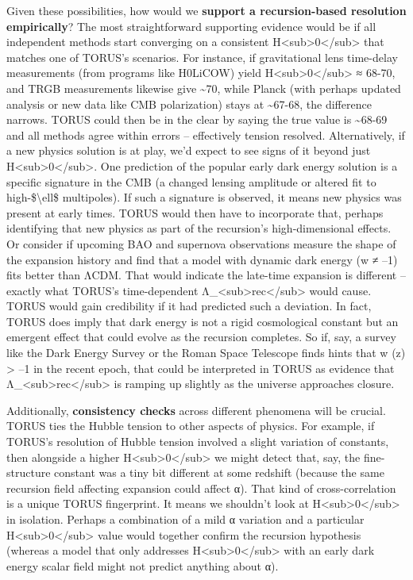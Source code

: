\documentclass[]{article}
\begin{document}
Given these possibilities, how would we \textbf{support a
recursion-based resolution empirically}? The most straightforward
supporting evidence would be if all independent methods start converging
on a consistent
H\textless{}sub\textgreater{}0\textless{}/sub\textgreater{} that matches
one of TORUS's scenarios. For instance, if gravitational lens time-delay
measurements (from programs like H0LiCOW) yield
H\textless{}sub\textgreater{}0\textless{}/sub\textgreater{} ≈ 68-70, and
TRGB measurements likewise give \textasciitilde{}70, while Planck (with
perhaps updated analysis or new data like CMB polarization) stays at
\textasciitilde{}67-68, the difference narrows. TORUS could then be in
the clear by saying the true value is \textasciitilde{}68-69 and all
methods agree within errors -- effectively tension resolved.
Alternatively, if a new physics solution is at play, we'd expect to see
signs of it beyond just
H\textless{}sub\textgreater{}0\textless{}/sub\textgreater{}. One
prediction of the popular early dark energy solution is a specific
signature in the CMB (a changed lensing amplitude or altered fit to
high-\$\textbackslash{}ell\$ multipoles). If such a signature is
observed, it means new physics was present at early times. TORUS would
then have to incorporate that, perhaps identifying that new physics as
part of the recursion's high-dimensional effects. Or consider if
upcoming BAO and supernova observations measure the shape of the
expansion history and find that a model with dynamic dark energy (w ≠
--1) fits better than ΛCDM. That would indicate the late-time expansion
is different -- exactly what TORUS's time-dependent
Λ\_\textless{}sub\textgreater{}rec\textless{}/sub\textgreater{} would
cause. TORUS would gain credibility if it had predicted such a
deviation. In fact, TORUS does imply that dark energy is not a rigid
cosmological constant but an emergent effect that could evolve as the
recursion completes​. So if, say, a survey like the Dark Energy Survey
or the Roman Space Telescope finds hints that w (z) \textgreater{} --1
in the recent epoch, that could be interpreted in TORUS as evidence that
Λ\_\textless{}sub\textgreater{}rec\textless{}/sub\textgreater{} is
ramping up slightly as the universe approaches closure.

Additionally, \textbf{consistency checks} across different phenomena
will be crucial. TORUS ties the Hubble tension to other aspects of
physics. For example, if TORUS's resolution of Hubble tension involved a
slight variation of constants, then alongside a higher
H\textless{}sub\textgreater{}0\textless{}/sub\textgreater{} we might
detect that, say, the fine-structure constant was a tiny bit different
at some redshift (because the same recursion field affecting expansion
could affect α). That kind of cross-correlation is a unique TORUS
fingerprint. It means we shouldn't look at
H\textless{}sub\textgreater{}0\textless{}/sub\textgreater{} in
isolation. Perhaps a combination of a mild α variation and a particular
H\textless{}sub\textgreater{}0\textless{}/sub\textgreater{} value would
together confirm the recursion hypothesis (whereas a model that only
addresses H\textless{}sub\textgreater{}0\textless{}/sub\textgreater{}
with an early dark energy scalar field might not predict anything about
α).
\end{document}
